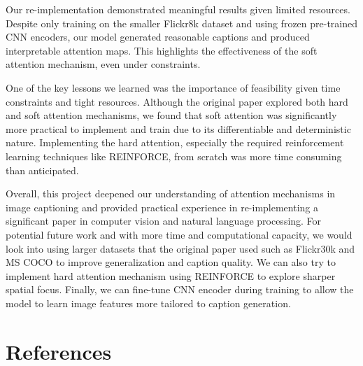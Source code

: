 \documentclass{article}
\begin{document}
Our re-implementation demonstrated meaningful results given limited resources. Despite only training on the smaller Flickr8k dataset and using frozen pre-trained CNN encoders, our model generated reasonable captions and produced interpretable attention maps. This highlights the effectiveness of the soft attention mechanism, even under constraints.

One of the key lessons we learned was the importance of feasibility given time constraints and tight resources. Although the original paper explored both hard and soft attention mechanisms, we found that soft attention was significantly more practical to implement and train due to its differentiable and deterministic nature. Implementing the hard attention, especially the required reinforcement learning techniques like REINFORCE, from scratch was more time consuming than anticipated.

Overall, this project deepened our understanding of attention mechanisms in image captioning and provided practical experience in re-implementing a significant paper in computer vision and natural language processing. For potential future work and with more time and computational capacity, we would look into using larger datasets that the original paper used such as Flickr30k and MS COCO to improve generalization and caption quality. We can also try to implement hard attention mechanism using REINFORCE to explore sharper spatial focus. Finally, we can fine-tune CNN encoder during training to allow the model to learn image features more tailored to caption generation.


\section{References}
\end{document}
